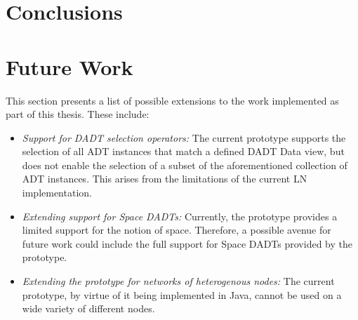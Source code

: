 
\section{Conclusions}


\section{Future Work}

This section presents a list of possible extensions to the work implemented as
part of this thesis. These include:

\begin{itemize}
  \item \emph{Support for DADT selection operators:} The current prototype
  supports the selection of all ADT instances that match a defined DADT Data
  view, but does not enable the selection of a subset of the aforementioned
  collection of ADT instances. This arises from the limitations of the current
  LN implementation.
  \item \emph{Extending support for Space DADTs:} Currently, the prototype
  provides a limited support for the notion of space. Therefore, a possible
  avenue for future work could include the full support for Space DADTs
  provided by the prototype.
  \item \emph{Extending the prototype for networks of heterogenous nodes:}
  The current prototype, by virtue of it being implemented in Java, cannot be
  used on a wide variety of different nodes. 
\end{itemize}
